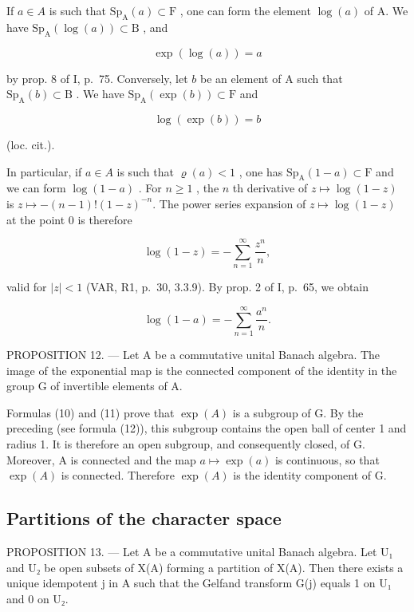 If \(a \in A\) is such that \(\mathrm{Sp}_{\mathrm{A}}(a) \subset \mathrm{F}\) , one can form the element \(\log(a)\) of A. We have \(\mathrm{Sp}_{\mathrm{A}}(\log(a)) \subset \mathrm{B}\) , and

\[
\exp (\log (a)) = a\tag{12}
\]

by prop. 8 of I, p.~75. Conversely, let \(b\) be an element of A such that \(\mathrm{Sp}_{\mathrm{A}}(b) \subset \mathrm{B}\) . We have \(\mathrm{Sp}_{\mathrm{A}}(\exp(b)) \subset \mathrm{F}\) and

\[
\log (\exp (b)) = b\tag{13}
\]

(loc. cit.).

In particular, if \(a \in A\) is such that \(\varrho(a) < 1\) , one has \(\mathrm{Sp}_{\mathrm{A}}(1 - a) \subset \mathrm{F}\) and we can form \(\log(1 - a)\) . For \(n \geqslant 1\) , the \(n\) th derivative of \(z \mapsto \log(1 - z)\) is \(z \mapsto -(n - 1)! (1 - z)^{-n}\). The power series expansion of \(z \mapsto \log(1 - z)\) at the point 0 is therefore

\[
\log (1 - z) = - \sum_ {n = 1} ^ {\infty} \frac {z ^ {n}}{n},
\]

valid for \(|z| < 1\) (VAR, R1, p.~30, 3.3.9). By prop. 2 of I, p.~65, we obtain

\[
\log (1 - a) = - \sum_ {n = 1} ^ {\infty} \frac {a ^ {n}}{n}.\tag{14}
\]

PROPOSITION 12. --- Let A be a commutative unital Banach algebra. The image of the exponential map is the connected component of the identity in the group G of invertible elements of A.

Formulas (10) and (11) prove that \(\exp(A)\) is a subgroup of G. By the preceding (see formula (12)), this subgroup contains the open ball of center 1 and radius 1. It is therefore an open subgroup, and consequently closed, of G. Moreover, A is connected and the map \(a \mapsto \exp(a)\) is continuous, so that \(\exp(A)\) is connected. Therefore \(\exp(A)\) is the identity component of G.

\subsection{Partitions of the character space}

PROPOSITION 13. --- Let A be a commutative unital Banach algebra. Let U₁ and U₂ be open subsets of X(A) forming a partition of X(A). Then there exists a unique idempotent j in A such that the Gelfand transform G(j) equals 1 on U₁ and 0 on U₂.

